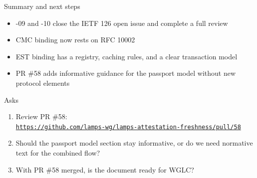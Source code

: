 \documentclass[aspectratio=169,10pt]{beamer}
\begin{document}
\begin{frame}{Summary and next steps}
  \begin{itemize}
    \item -09 and -10 close the IETF 126 open issue and complete a full review
    \item CMC binding now rests on RFC 10002
    \item EST binding has a registry, caching rules, and a clear transaction model
    \item PR \#58 adds informative guidance for the passport model without new
          protocol elements
  \end{itemize}

  \vspace{0.3cm}
  \begin{block}{Asks}
    \begin{enumerate}
      \item Review PR \#58:\\
            \href{https://github.com/lamps-wg/lamps-attestation-freshness/pull/58}{\footnotesize\texttt{https://github.com/lamps-wg/lamps-attestation-freshness/pull/58}}
      \item Should the passport model section stay informative, or do we need
            normative text for the combined flow?
      \item With PR \#58 merged, is the document ready for WGLC?
    \end{enumerate}
  \end{block}
\end{frame}
\end{document}
